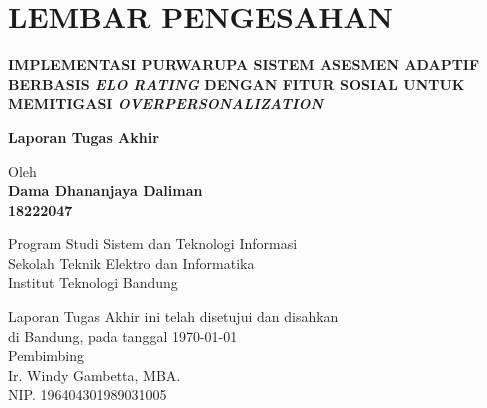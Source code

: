 \chapter*{LEMBAR PENGESAHAN}


\begin{center}
    \vspace{2cm}
  {\large\bfseries IMPLEMENTASI PURWARUPA SISTEM ASESMEN ADAPTIF BERBASIS \textit{ELO RATING} DENGAN FITUR SOSIAL UNTUK MEMITIGASI \textit{OVERPERSONALIZATION}}\\
     \vspace{2cm}

  {\Large \textbf{Laporan Tugas Akhir}}\\


  \vspace{1.5cm}
    
    
  {\large Oleh}\\[0.3cm]
    \textbf{
    {\large Dama Dhananjaya Daliman}\\
    {\large 18222047}
  }\\
    
  \vspace{0.5cm}
 
  {\large Program Studi Sistem dan Teknologi Informasi}\\
  {\large Sekolah Teknik Elektro dan Informatika}\\
  {\large Institut Teknologi Bandung}\\

  \vspace{1.5cm}

  Laporan Tugas Akhir ini telah disetujui dan disahkan\\ 
  di Bandung, pada tanggal \today\\[1cm]

	Pembimbing  \\[3cm]
	Ir. Windy Gambetta, MBA.   \\[0.2cm]
	NIP. 196404301989031005 

\end{center}

\vspace{1cm}
\noindent
